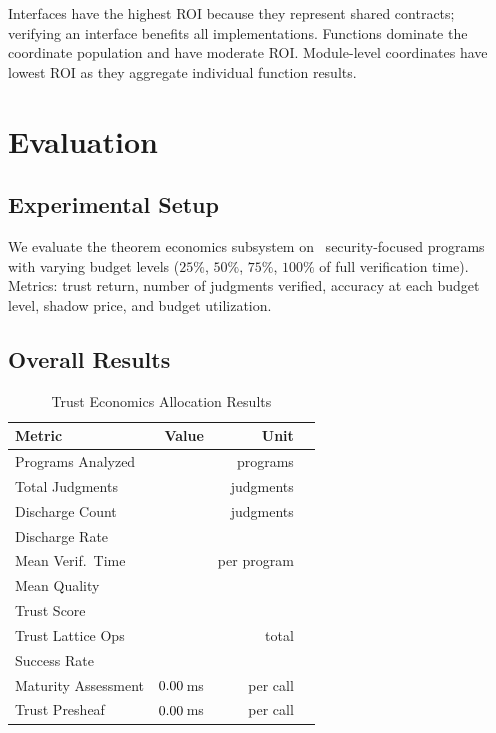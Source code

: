 \documentclass[11pt]{article}
\begin{document}
Interfaces have the highest ROI because they represent shared
contracts; verifying an interface benefits all implementations.
Functions dominate the coordinate population and have moderate ROI.
Module-level coordinates have lowest ROI as they aggregate
individual function results.

\section{Evaluation}\label{sec:evaluation}

\subsection{Experimental Setup}
We evaluate the theorem economics subsystem on \ppLVtotalPrograms\
security-focused programs with varying budget levels
($25\%$, $50\%$, $75\%$, $100\%$ of full verification time).
Metrics: trust return, number of judgments verified, accuracy at
each budget level, shadow price, and budget utilization.

\subsection{Overall Results}

\begin{table}[H]
\centering
\caption{Trust Economics Allocation Results}
\label{tab:econ-results}
\begin{tabular}{lrrr}
\toprule
\textbf{Metric} & \textbf{Value} & \textbf{Unit} \\
\midrule
Programs Analyzed & \ppLVtotalPrograms & programs \\
Total Judgments & \ppLVtotalJudgments & judgments \\
Discharge Count & \ppLVdischargeCount & judgments \\
Discharge Rate & \ppLVdischargePct & \\
Mean Verif.\ Time & \ppLVmeanEvalTime & per program \\
Mean Quality & \ppLVmeanQuality & \\
Trust Score & \ppLVmeanTrustScore & \\
Trust Lattice Ops & \ppLVtrustLatticeOps & total \\
Success Rate & \ppLVsuccessRate & \\
Maturity Assessment & $0.00$\,ms & per call \\
Trust Presheaf & $0.00$\,ms & per call \\
\bottomrule
\end{tabular}
\end{table}
\end{document}
